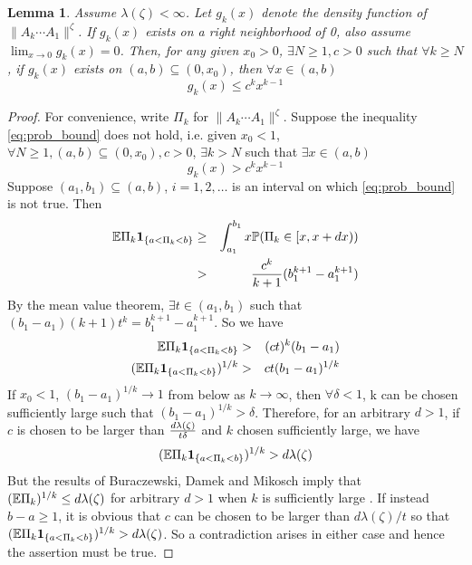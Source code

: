 \documentclass{article}
\newtheorem{lemma}{Lemma}
\theoremstyle{remark}
\begin{document}
\begin{lemma}\label{lemma:prob_bound}
  Assume $\lambda(\zeta) < \infty$. Let $g_k(x)$ denote the density
  function of $\|A_k \cdots A_1\|^\zeta$. If $g_k(x)$ exists on a
  right neighborhood of 0, also assume $\lim_{x\to 0} g_k(x) =
  0$. Then, for any given $x_0 > 0$, $\exists N \geq 1, c >
  0$ such that $\forall k \geq N$, if $g_k(x)$ exists on $(a, b)
  \subseteq (0, x_0)$, then $\forall x \in (a, b)$
  \begin{equation}
    \label{eq:prob_bound}
    g_k(x) \leq c^k x^{k-1}
  \end{equation}
\end{lemma}
\begin{proof}
  For convenience, write $\Pi_k$ for $\|A_k \cdots A_1\|^\zeta$. Suppose
  the inequality \eqref{eq:prob_bound} does not hold, i.e. given
  $x_0 < 1$, $\forall N \geq 1, (a, b) \subseteq (0, x_0), c
  > 0$, $\exists k > N$ such that $\exists x \in  (a, b)$
  \begin{equation*}
    g_k(x) > c^k x^{k-1}
  \end{equation*}
  Suppose $(a_1, b_1) \subseteq (a, b)$, $i = 1, 2, \dots$ is
  an interval on which \eqref{eq:prob_bound} is not true. Then
  \begin{eqnarray*}
    \mathbb{E} \Pi_k \mathbf{1}_{\{a < \Pi_k < b\}} &\geq&
    \int_{a_1}^{b_1} x \mathbb{P}(\Pi_k \in [x, x+dx)) \\
    &>& {c^k \over k + 1} (b_1^{k+1} - a_1^{k+1})
  \end{eqnarray*}
  By the mean value theorem, $\exists t \in (a_1, b_1)$ such that
  $(b_1 - a_1)(k+1) t^k = b_1^{k+1} - a_1^{k+1}$. So we have
  \begin{eqnarray*}
    \mathbb{E} \Pi_k \mathbf{1}_{\{a < \Pi_k < b\}} &>& (c t)^k(b_1 - a_1) \\
    (\mathbb{E} \Pi_k \mathbf{1}_{\{a < \Pi_k < b\}})^{1/k} &>& c t (b_1 - a_1)^{1/k}
  \end{eqnarray*}
  If $x_0 < 1$, $(b_1 - a_1)^{1/k} \to 1$ from below as $k \to
  \infty$, then $\forall \delta < 1$, k can be chosen sufficiently
  large such that $(b_1 - a_1)^{1/k} > \delta$. Therefore, for an arbitrary
  $d > 1$, if $c$ is chosen to be larger than ${d\lambda(\zeta) \over
    t \delta}$ and $k$ chosen sufficiently large, we have
  \[
  (\mathbb{E} \Pi_k \mathbf{1}_{\{a < \Pi_k < b\}})^{1/k} > d \lambda(\zeta)
  \]
  But the results of Buraczewski, Damek and Mikosch imply
  that $(\mathbb{E} \Pi_k)^{1/k} \leq d \lambda(\zeta)$ for arbitrary $d > 1$
  when $k$ is sufficiently large \cite{BuraczewskiDamekMikosch2015}.
  If instead $b - a \geq 1$, it is obvious that $c$ can be chosen to
  be larger than $d\lambda(\zeta)/t$ so that $(\mathbb{E} \Pi_k \mathbf{1}_{\{a < \Pi_k
    < b\}})^{1/k} > d\lambda(\zeta)$.  So a contradiction arises in
  either case and hence the assertion must be true.
\end{proof}
\end{document}
